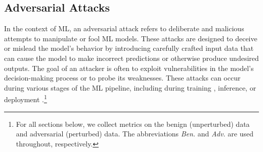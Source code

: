 

\subsection{Adversarial Attacks}

In the context of ML, an adversarial attack refers to deliberate and malicious attempts to manipulate or fool ML models. These attacks are designed to deceive or mislead the model's behavior by introducing carefully crafted input data that can cause the model to make incorrect predictions or otherwise produce undesired outputs. The goal of an attacker is often to exploit vulnerabilities in the model's decision-making process or to probe its weaknesses. These attacks can occur during various stages of the ML pipeline, including during training \citep{biggio_poisoning_2013}, inference\citep{biggio_evasion_2013}, or deployment \citep{santos2021universal}.\footnote{For all sections below, we collect metrics on the benign (unperturbed) data and adversarial (perturbed) data. The abbreviations \textit{Ben.} and \textit{Adv.} are used throughout, respectively.}


